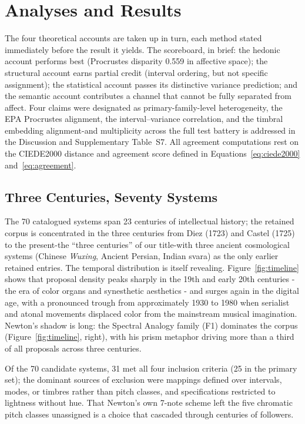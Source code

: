 \documentclass[12pt]{article}
\begin{document}
\section{Analyses and Results}
\label{sec:results}

The four theoretical accounts are taken up in turn, each method stated
immediately before the result it yields. The scoreboard, in brief: the
hedonic account performs best (Procrustes disparity 0.559 in affective
space); the structural account earns partial credit (interval ordering,
but not specific assignment); the statistical account passes its
distinctive variance prediction; and the semantic account contributes a
channel that cannot be fully separated from affect. Four claims were
designated as primary-family-level heterogeneity, the EPA Procrustes
alignment, the interval--variance correlation, and the timbral
embedding alignment-and multiplicity across the full test battery is
addressed in the Discussion and Supplementary Table~S7. All agreement
computations rest on the CIEDE2000 distance and agreement score defined
in Equations~\ref{eq:ciede2000} and~\ref{eq:agreement}.

\subsection{Three Centuries, Seventy Systems}

The 70 catalogued systems span 23 centuries of intellectual history;
the retained corpus is concentrated in the three centuries from Diez
(1723) and Castel (1725) to the present-the ``three centuries'' of
our title-with three ancient cosmological systems (Chinese
\textit{Wuxing}, Ancient Persian, Indian svara) as the only earlier
retained entries. The
temporal distribution is itself revealing. Figure~\ref{fig:timeline}
shows that proposal density peaks sharply in the 19th and early 20th
centuries - the era of color organs and synesthetic aesthetics - and
surges again in the digital age, with a pronounced trough from
approximately 1930 to 1980 when serialist and atonal movements
displaced color from the mainstream musical imagination. Newton's
shadow is long: the Spectral Analogy family (F1) dominates the corpus
(Figure~\ref{fig:timeline}, right), with his prism metaphor driving
more than a third of all proposals across three centuries.

Of the 70 candidate systems, 31 met all four inclusion criteria (25
in the primary set); the dominant sources of exclusion were mappings
defined over intervals, modes, or timbres rather than pitch classes,
and specifications restricted to lightness without hue. That Newton's
own 7-note scheme left the five chromatic pitch classes unassigned is
a choice that cascaded through centuries of followers.
\end{document}

